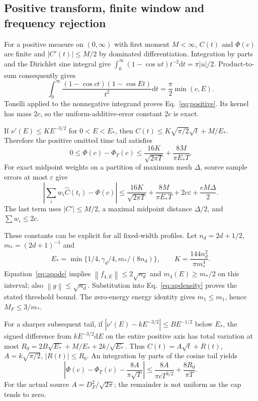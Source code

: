 \documentclass[aps,pra,reprint,superscriptaddress,longbibliography]{revtex4-2}
\newcommand{\dd}{\mathrm d}
\newcommand{\norm}[1]{\left\lVert#1\right\rVert}
\begin{document}
\subsection{Positive transform, finite window and frequency rejection}

For a positive measure on $(0,\infty)$ with first moment $M<\infty$,
$C(t)$ and $\Phi(c)$ are finite and $|C'(t)|\le M/2$ by dominated
differentiation. Integration by parts and the Dirichlet sine integral
give $\int_0^\infty(1-\cos ut)t^{-2}\dd t=\pi|u|/2$.
Product-to-sum consequently gives
\begin{equation}
 \int_0^\infty\frac{(1-\cos ct)(1-\cos Et)}{t^2}\dd t
                          =\frac\pi2\min(c,E).            \label{eq:apcosine}
\end{equation}
Tonelli applied to the nonnegative integrand proves
Eq.~\eqref{eq:positive}. Its kernel has mass $2c$, so the
uniform-additive-error constant $2c$ is exact.

If $\nu'(E)\le K E^{-3/2}$ for $0<E<E_*$, then
$C(t)\le K\sqrt{\pi/2}\sqrt t+M/E_*$. Therefore the positive
omitted time tail satisfies
\begin{equation}
 0\le\Phi(c)-\Phi_T(c)
 \le\frac{16K}{\sqrt{2\pi T}}+\frac{8M}{\pi E_*T}.      \label{eq:aptimetail}
\end{equation}
For exact midpoint weights on a partition of maximum mesh $\Delta$,
source sample errors at most $\varepsilon$ give
\begin{equation}
 \left|\sum_iw_i\widehat C(t_i)-\Phi(c)\right|
 \le\frac{16K}{\sqrt{2\pi T}}+\frac{8M}{\pi E_*T}
                  +2c\varepsilon+\frac{cM\Delta}{2}.     \label{eq:apquadrature}
\end{equation}
The last term uses $|C'|\le M/2$, a maximal midpoint distance
$\Delta/2$, and $\sum w_i\le2c$.

These constants can be explicit for all fixed-width profiles.
Let $n_d=2d+1/2$, $m_*=(2d+1)^{-1}$ and
\begin{equation}
 E_*=\min\{1/4,\gamma_d/4,m_*/(8n_d)\},\qquad
 K=\frac{144n_d^2}{\pi m_*^4}.                            \label{eq:approfileconstants}
\end{equation}
Equation~\eqref{eq:apode} implies
$\norm{f_{4,E}}\le2\sqrt{n_d}$ and $m_4(E)\ge m_*/2$
on this interval; also $\norm g\le\sqrt{n_d}$. Substitution into
Eq.~\eqref{eq:apdensity} proves the stated threshold bound.
The zero-energy energy identity gives $\dot m_1\le m_1$, hence
$M_F\le3/m_*$.

For a sharper subsequent tail, if
$|\nu'(E)-kE^{-3/2}|\le BE^{-1/2}$ below $E_*$, the signed
difference from $kE^{-3/2}\dd E$ on the entire positive axis has
total variation at most
$R_0=2B\sqrt{E_*}+M/E_*+2k/\sqrt{E_*}$. Thus
$C(t)=A\sqrt t+R(t)$, $A=k\sqrt{\pi/2}$, $|R(t)|\le R_0$.
An integration by parts of the cosine tail yields
\begin{equation}
 \left|\Phi(c)-\Phi_T(c)-\frac{8A}{\pi\sqrt T}\right|
 \le\frac{8A}{\pi cT^{3/2}}+\frac{8R_0}{\pi T}.           \label{eq:apleadingtail}
\end{equation}
For the actual source $A=D_F^2/\sqrt{2\pi}$; the remainder is
not uniform as the cap tends to zero.
\end{document}
